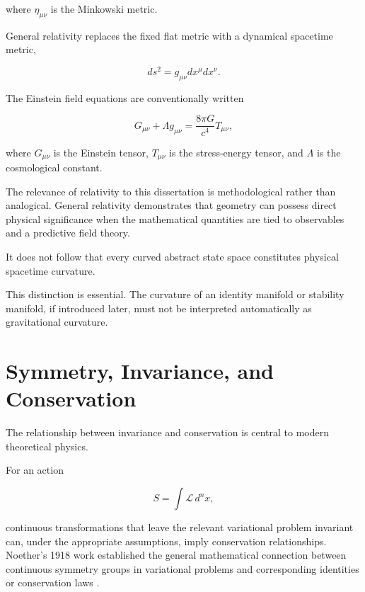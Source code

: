 \documentclass[12pt,oneside]{book}
\begin{document}
where \(\eta_{\mu\nu}\) is the Minkowski metric.

General relativity replaces the fixed flat metric with a
dynamical spacetime metric,

\begin{equation}
    ds^2
    =
    g_{\mu\nu}
    dx^\mu dx^\nu.
    \label{eq:general-spacetime-interval}
\end{equation}

The Einstein field equations are conventionally written

\begin{equation}
    G_{\mu\nu}
    +
    \Lambda g_{\mu\nu}
    =
    \frac{8\pi G}{c^4}
    T_{\mu\nu},
    \label{eq:einstein-field-equations}
\end{equation}

where \(G_{\mu\nu}\) is the Einstein tensor,
\(T_{\mu\nu}\) is the stress-energy tensor, and
\(\Lambda\) is the cosmological constant.

The relevance of relativity to this dissertation is
methodological rather than analogical. General relativity
demonstrates that geometry can possess direct physical
significance when the mathematical quantities are tied to
observables and a predictive field theory.

It does not follow that every curved abstract state space
constitutes physical spacetime curvature.

This distinction is essential. The curvature of an identity
manifold or stability manifold, if introduced later, must not
be interpreted automatically as gravitational curvature.


\section{Symmetry, Invariance, and Conservation}
\label{sec:noether-history}

The relationship between invariance and conservation is central
to modern theoretical physics.

For an action

\begin{equation}
    S
    =
    \int
    \mathcal{L}
    \,d^n x,
    \label{eq:field-action}
\end{equation}

continuous transformations that leave the relevant variational
problem invariant can, under the appropriate assumptions, imply
conservation relationships. Noether's 1918 work established the
general mathematical connection between continuous symmetry
groups in variational problems and corresponding identities or
conservation laws \parencite{Noether1918}.
\end{document}
